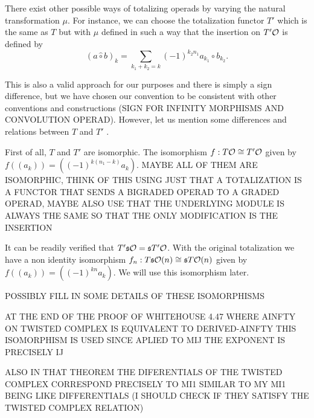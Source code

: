 \documentclass[twoside]{article}
\begin{document}
\begin{remark}
There exist other possible ways of totalizing operads by varying the natural transformation $\mu$. For instance, we can choose the totalization functor $T'$ which is the same as $T$ but  with $\mu$ defined in such a way that the insertion on $T'{\mathcal O}$ is defined by \[(a\hat{\circ}b)_k=\sum_{k_1+k_2=k}(-1)^{k_2n_1}a_{k_1}\circ b_{k_2}.\] 

This is also a valid approach for our purposes and there is simply a sign difference, but we have chosen our convention to be consistent with other conventions and constructions (SIGN FOR INFINITY MORPHISMS AND CONVOLUTION OPERAD). However, let us mention some differences and relations between $T$ and $T'$ . %

First of all, $T$ and $T'$ are isomorphic. The isomorphism $f:T{\mathcal O}\cong T'{\mathcal O}$ given by $f((a_k))=((-1)^{k(n_1-k)}a_k)$. MAYBE ALL OF THEM ARE ISOMORPHIC, THINK OF THIS USING JUST THAT A TOTALIZATION IS A FUNCTOR THAT SENDS A BIGRADED OPERAD TO A GRADED OPERAD, MAYBE ALSO USE THAT THE UNDERLYING MODULE IS ALWAYS THE SAME SO THAT THE ONLY MODIFICATION IS THE INSERTION

It can be readily verified that $T'\mathfrak{s}{\mathcal O}=\mathfrak{s} T'{\mathcal O}$. With the original totalization we have a non identity isomorphism $f_n:T\mathfrak{s}{\mathcal O}(n)\cong\mathfrak{s} T{\mathcal O}(n)$ given by $f((a_k))=((-1)^{kn}a_k)$. We will use this isomorphism later.

POSSIBLY FILL IN SOME DETAILS OF THESE ISOMORPHISMS

AT THE END  OF THE PROOF OF WHITEHOUSE 4.47 WHERE AINFTY ON TWISTED COMPLEX IS EQUIVALENT TO DERIVED-AINFTY THIS ISOMORPHISM IS  USED SINCE APLIED TO MIJ  THE EXPONENT IS PRECISELY IJ

ALSO IN THAT THEOREM THE DIFERENTIALS OF THE TWISTED COMPLEX CORRESPOND PRECISELY TO MI1 SIMILAR TO MY MI1 BEING LIKE DIFFERENTIALS (I SHOULD CHECK IF THEY SATISFY THE TWISTED COMPLEX RELATION)
\end{remark}
\end{document}
